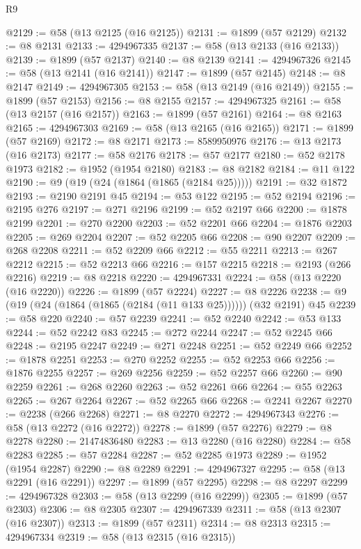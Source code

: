\begin{lexlean}{R9}
\begin{coremodule}
@2129 := @58 (@13 @2125 (@16 @2125))
@2131 := @1899 (@57 @2129)
@2132 := @8 @2131
@2133 := 4294967335
@2137 := @58 (@13 @2133 (@16 @2133))
@2139 := @1899 (@57 @2137)
@2140 := @8 @2139
@2141 := 4294967326
@2145 := @58 (@13 @2141 (@16 @2141))
@2147 := @1899 (@57 @2145)
@2148 := @8 @2147
@2149 := 4294967305
@2153 := @58 (@13 @2149 (@16 @2149))
@2155 := @1899 (@57 @2153)
@2156 := @8 @2155
@2157 := 4294967325
@2161 := @58 (@13 @2157 (@16 @2157))
@2163 := @1899 (@57 @2161)
@2164 := @8 @2163
@2165 := 4294967303
@2169 := @58 (@13 @2165 (@16 @2165))
@2171 := @1899 (@57 @2169)
@2172 := @8 @2171
@2173 := 8589950976
@2176 := @13 @2173 (@16 @2173)
@2177 := @58 @2176
@2178 := @57 @2177
@2180 := @52 @2178 @1973
@2182 := @1952 (@1954 @2180)
@2183 := @8 @2182
@2184 := @11 @122
@2190 := @9 (@19 (@24 (@1864 (@1865 (@2184 @25)))))
@2191 := @32 @1872
@2193 := @2190 @2191 @45
@2194 := @53 @122
@2195 := @52 @2194
@2196 := @2195 @276
@2197 := @271 @2196
@2199 := @52 @2197 @66
@2200 := @1878 @2199
@2201 := @270 @2200
@2203 := @52 @2201 @66
@2204 := @1876 @2203
@2205 := @269 @2204
@2207 := @52 @2205 @66
@2208 := @90 @2207
@2209 := @268 @2208
@2211 := @52 @2209 @66
@2212 := @55 @2211
@2213 := @267 @2212
@2215 := @52 @2213 @66
@2216 := @157 @2215
@2218 := @2193 (@266 @2216)
@2219 := @8 @2218
@2220 := 4294967331
@2224 := @58 (@13 @2220 (@16 @2220))
@2226 := @1899 (@57 @2224)
@2227 := @8 @2226
@2238 := @9 (@19 (@24 (@1864 (@1865 (@2184 (@11 @133 @25)))))) (@32 @2191) @45
@2239 := @58 @220
@2240 := @57 @2239
@2241 := @52 @2240
@2242 := @53 @133
@2244 := @52 @2242 @83
@2245 := @272 @2244
@2247 := @52 @2245 @66
@2248 := @2195 @2247
@2249 := @271 @2248
@2251 := @52 @2249 @66
@2252 := @1878 @2251
@2253 := @270 @2252
@2255 := @52 @2253 @66
@2256 := @1876 @2255
@2257 := @269 @2256
@2259 := @52 @2257 @66
@2260 := @90 @2259
@2261 := @268 @2260
@2263 := @52 @2261 @66
@2264 := @55 @2263
@2265 := @267 @2264
@2267 := @52 @2265 @66
@2268 := @2241 @2267
@2270 := @2238 (@266 @2268)
@2271 := @8 @2270
@2272 := 4294967343
@2276 := @58 (@13 @2272 (@16 @2272))
@2278 := @1899 (@57 @2276)
@2279 := @8 @2278
@2280 := 21474836480
@2283 := @13 @2280 (@16 @2280)
@2284 := @58 @2283
@2285 := @57 @2284
@2287 := @52 @2285 @1973
@2289 := @1952 (@1954 @2287)
@2290 := @8 @2289
@2291 := 4294967327
@2295 := @58 (@13 @2291 (@16 @2291))
@2297 := @1899 (@57 @2295)
@2298 := @8 @2297
@2299 := 4294967328
@2303 := @58 (@13 @2299 (@16 @2299))
@2305 := @1899 (@57 @2303)
@2306 := @8 @2305
@2307 := 4294967339
@2311 := @58 (@13 @2307 (@16 @2307))
@2313 := @1899 (@57 @2311)
@2314 := @8 @2313
@2315 := 4294967334
@2319 := @58 (@13 @2315 (@16 @2315))

\end{coremodule}
\end{lexlean}
